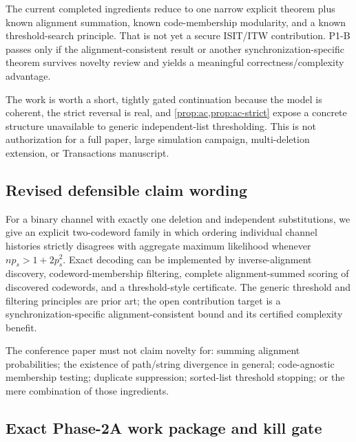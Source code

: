\documentclass[11pt]{article}
\theoremstyle{definition}
\theoremstyle{remark}
\begin{document}
\begin{stopbox}
The current completed ingredients reduce to one narrow explicit theorem plus known alignment summation, known code-membership modularity, and a known threshold-search principle. That is not yet a secure ISIT/ITW contribution. P1-B passes only if the alignment-consistent result or another synchronization-specific theorem survives novelty review and yields a meaningful correctness/complexity advantage.
\end{stopbox}

\begin{gatebox}
The work is worth a short, tightly gated continuation because the model is coherent, the strict reversal is real, and \cref{prop:ac,prop:ac-strict} expose a concrete structure unavailable to generic independent-list thresholding. This is not authorization for a full paper, large simulation campaign, multi-deletion extension, or Transactions manuscript.
\end{gatebox}

\subsection{Revised defensible claim wording}

\begin{freezebox}
For a binary channel with exactly one deletion and independent substitutions, we give an explicit two-codeword family in which ordering individual channel histories strictly disagrees with aggregate maximum likelihood whenever $np_s>1+2p_s^2$. Exact decoding can be implemented by inverse-alignment discovery, codeword-membership filtering, complete alignment-summed scoring of discovered codewords, and a threshold-style certificate. The generic threshold and filtering principles are prior art; the open contribution target is a synchronization-specific alignment-consistent bound and its certified complexity benefit.
\end{freezebox}

The conference paper must not claim novelty for: summing alignment probabilities; the existence of path/string divergence in general; code-agnostic membership testing; duplicate suppression; sorted-list threshold stopping; or the mere combination of those ingredients.

\subsection{Exact Phase-2A work package and kill gate}
\label{sec:phase2a}
\end{document}
